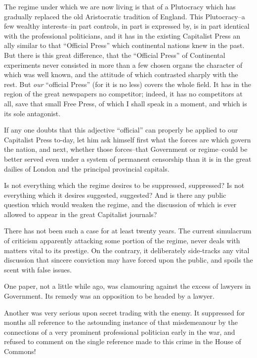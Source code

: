 \documentclass{book}
\begin{document}
The regime under which we are now living is that of a Plutocracy which has gradually replaced the old Aristocratic tradition of England. This Plutocracy–a few wealthy interests–in part controls, in part is expressed by, is in part identical with the professional politicians, and it has in the existing Capitalist Press an ally similar to that “Official Press” which continental nations knew in the past. But there is this great difference, that the “Official Press” of Continental experiments never consisted in more than a few chosen organs the character of which was well known, and the attitude of which contrasted sharply with the rest. But \emph{our} “official Press” (for it is no less) covers the whole field. It has in the region of the great newspapers no competitor; indeed, it has no competitors at all, save that small Free Press, of which I shall speak in a moment, and which is its sole antagonist.

If any one doubts that this adjective “official” can properly be applied to our Capitalist Press to-day, let him ask himself first what the forces are which govern the nation, and next, whether those forces–that Government or regime–could be better served even under a system of permanent censorship than it is in the great dailies of London and the principal provincial capitals.

Is not everything which the regime desires to be suppressed, suppressed? Is not everything which it desires suggested, suggested? And is there any public question which would weaken the regime, and the discussion of which is ever allowed to appear in the great Capitalist journals?

There has not been such a case for at least twenty years. The current simulacrum of criticism apparently attacking some portion of the regime, never deals with matters vital to its prestige. On the contrary, it deliberately side-tracks any vital discussion that sincere conviction may have forced upon the public, and spoils the scent with false issues.

One paper, not a little while ago, was clamouring against the excess of lawyers in Government. Its remedy was an opposition to be headed by a lawyer.

Another was very serious upon secret trading with the enemy. It suppressed for months all reference to the astounding instance of that misdemeanour by the connections of a very prominent professional politician early in the war, and refused to comment on the single reference made to this crime in the House of Commons!
\end{document}
